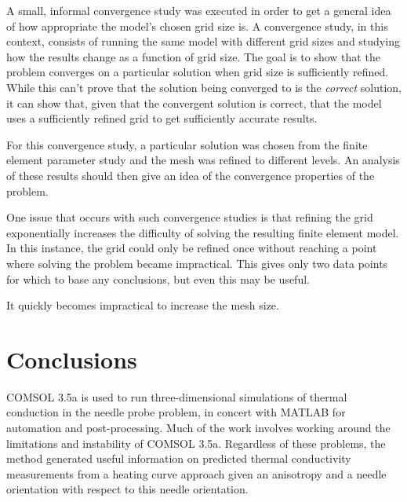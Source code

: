 A small, informal convergence study was executed in order to get a general idea
of how appropriate the model's chosen grid size is. A convergence study, in this
context, consists of running the same model with different grid sizes and
studying how the results change as a function of grid size.  The goal is to show
that the problem converges on a particular solution when grid size is
sufficiently refined. While this can't prove that the solution being converged
to is the \emph{correct} solution, it can show that, given that the convergent
solution is correct, that the model uses a sufficiently refined grid to get
sufficiently accurate results.

For this convergence study, a particular solution was chosen from the finite
element parameter study and the mesh was refined to different levels. An
analysis of these results should then give an idea of the convergence properties
of the problem.

One issue that occurs with such convergence studies is that refining the grid
exponentially increases the difficulty of solving the resulting finite element
model. In this instance, the grid could only be refined once without reaching
a point where solving the problem became impractical. This gives only two data
points for which to base any conclusions, but even this may be useful.

\begin{table}[h]
\centering

\label{tab:conv_runtime}
\caption{It quickly becomes impractical to increase the mesh size.}
\end{table}

\section{Conclusions}

COMSOL 3.5a is used to run three-dimensional simulations of thermal conduction
in the needle probe problem, in concert with MATLAB for automation and
post-processing. Much of the work involves working around the limitations and
instability of COMSOL 3.5a. Regardless of these problems, the method generated
useful information on predicted thermal conductivity measurements from a heating
curve approach given an anisotropy and a needle orientation with respect to this
needle orientation.
